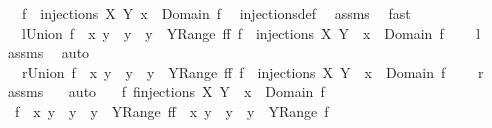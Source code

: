 \begin{isabellebody}
\ \ {}{\isacharcolon}\ {\isachardoublequoteopen}{\isasymforall}f\ {\isasymin}\ injections\ X\ Y{\isachardot}\ x\ {\isasymnotin}\ Domain\ f{\isachardoublequoteclose}\ \isamarkupfalse%
\ injections{\isacharunderscore}def\ \isamarkupfalse%
\ assms\ \isamarkupfalse%
\ fast\ \isamarkupfalse%
\ \isamarkupfalse%
\ \isanewline
\ \ {}{\isacharcolon}\ {\isachardoublequoteopen}{\isacharquery}l{\isacharequal}Union\ {\isacharbraceleft}{\isacharbraceleft}f\ {\isacharplus}{\isacharasterisk}\ {\isacharbraceleft}{\isacharparenleft}x{\isacharcomma}\ y{\isacharparenright}{\isacharbraceright}\ {\isacharbar}\ y\ {\isachardot}\ y\ {\isasymin}\ Y{\isacharminus}Range\ f{\isacharbraceright}{\isacharbar}f\ {\isachardot}f\ {\isasymin}\ injections\ X\ Y\ {\isacharampersand}\ x\ {\isasymnotin}\ Domain\ f{\isacharbraceright}{\isachardoublequoteclose}\ \isanewline
\ \ {\isacharparenleft}\ {\isachardoublequoteopen}{\isacharunderscore}{\isacharequal}{\isacharquery}l{\isacharprime}{\isachardoublequoteclose}{\isacharparenright}\ \isamarkupfalse%
\ assms\ \isamarkupfalse%
\ auto\ \isamarkupfalse%
\ \isamarkupfalse%
\ \isanewline
\ \ {}{\isacharcolon}\ {\isachardoublequoteopen}{\isacharquery}r{\isacharequal}Union\ {\isacharbraceleft}{\isacharbraceleft}f\ {\isasymunion}\ {\isacharbraceleft}{\isacharparenleft}x{\isacharcomma}\ y{\isacharparenright}{\isacharbraceright}\ {\isacharbar}\ y\ {\isachardot}\ y\ {\isasymin}\ Y{\isacharminus}Range\ f{\isacharbraceright}{\isacharbar}f\ {\isachardot}f\ {\isasymin}\ injections\ X\ Y\ {\isacharampersand}\ x\ {\isasymnotin}\ Domain\ f{\isacharbraceright}{\isachardoublequoteclose}\ \isanewline
\ \ {\isacharparenleft}\ {\isachardoublequoteopen}{\isacharunderscore}{\isacharequal}{\isacharquery}r{\isacharprime}{\isachardoublequoteclose}{\isacharparenright}\ \isamarkupfalse%
\ assms\ {}\ \isamarkupfalse%
\ auto\ \isamarkupfalse%
\ {\isachardoublequoteopen}{\isasymforall}\ f{\isachardot}\ f{\isasymin}injections\ X\ Y\ {\isacharampersand}\ x\ {\isasymnotin}\ Domain\ f\ {\isasymlongrightarrow}\ \isanewline
\ \ {\isacharbraceleft}f\ {\isacharplus}{\isacharasterisk}\ {\isacharbraceleft}{\isacharparenleft}x{\isacharcomma}\ y{\isacharparenright}{\isacharbraceright}\ {\isacharbar}\ y\ {\isachardot}\ y\ {\isasymin}\ Y{\isacharminus}Range\ f{\isacharbraceright}{\isacharequal}{\isacharbraceleft}f\ {\isasymunion}\ {\isacharbraceleft}{\isacharparenleft}x{\isacharcomma}\ y{\isacharparenright}{\isacharbraceright}\ {\isacharbar}\ y\ {\isachardot}\ y\ {\isasymin}\ Y{\isacharminus}Range\ f{\isacharbraceright}{\isachardoublequoteclose}\ \isamarkupfalse%

\end{isabellebody}

